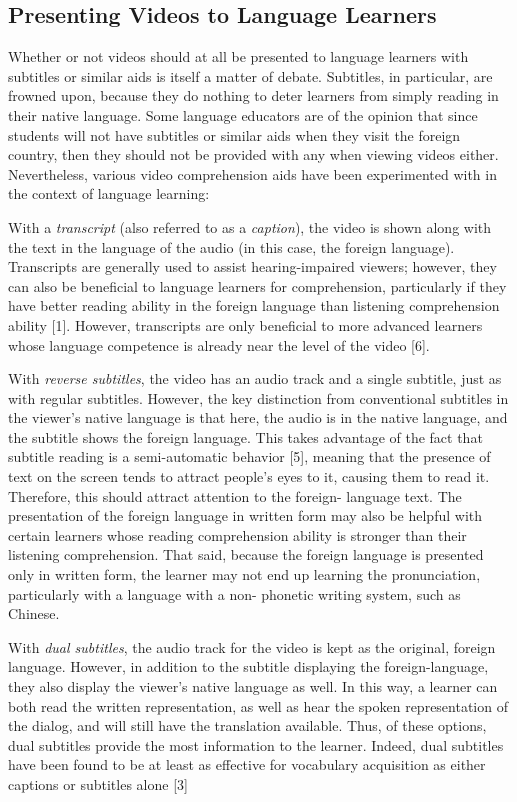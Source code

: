 \documentclass{sigchi}
\begin{document}
\subsection{Presenting Videos to Language Learners}

Whether or not videos should at all be presented to language learners with subtitles or similar aids is itself a matter of debate. Subtitles, in particular, are frowned upon, because they do nothing to deter learners from simply reading in their native language. Some language educators are of the opinion that since students will not have subtitles or similar aids when they visit the foreign country, then they should not be provided with any when viewing videos either. Nevertheless, various video comprehension aids have been experimented with in the context of language learning:

With a \emph{transcript} (also referred to as a \emph{caption}), the video is shown along with the text in the
language of the audio (in this case, the foreign language). Transcripts are generally used to
assist hearing-impaired viewers; however, they can also be beneficial to language learners for
comprehension, particularly if they have better reading ability in the foreign language than
listening comprehension ability [1]. However, transcripts are only beneficial to more advanced
learners whose language competence is already near the level of the video [6].

With \emph{reverse subtitles}, the video has an audio track and a single subtitle, just as with regular
subtitles. However, the key distinction from conventional subtitles in the viewer's native language is that here, the audio is in the native language, and
the subtitle shows the foreign language. This takes advantage of the fact that subtitle reading is
a semi-automatic behavior [5], meaning that the presence of text on the screen tends to attract
people's eyes to it, causing them to read it. Therefore, this should attract attention to the foreign-
language text. The presentation of the foreign language in written form may also be helpful with
certain learners whose reading comprehension ability is stronger than their listening
comprehension. That said, because the foreign language is presented only in written form, the
learner may not end up learning the pronunciation, particularly with a language with a non-
phonetic writing system, such as Chinese.

With \emph{dual subtitles}, the audio track for the video is kept as the original, foreign language.
However, in addition to the subtitle displaying the foreign-language, they also display the
viewer's native language as well. In this way, a learner can both read the written representation,
as well as hear the spoken representation of the dialog, and will still have the translation
available. Thus, of these options, dual subtitles provide the most information to the learner.
Indeed, dual subtitles have been found to be at least as effective for vocabulary acquisition as
either captions or subtitles alone [3]
\end{document}
